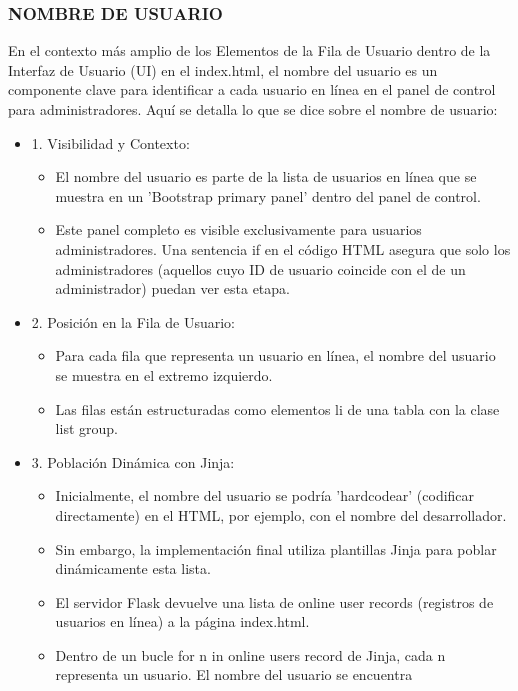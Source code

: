\documentclass{report}
\begin{document}
\subsubsection{NOMBRE DE USUARIO}
En el contexto más amplio de los Elementos de la Fila de Usuario dentro de la Interfaz de Usuario (UI) en el index.html, el nombre del 
usuario es un componente clave para identificar a cada usuario en línea en el panel de control para administradores.
Aquí se detalla lo que se dice sobre el nombre de usuario:
\begin{itemize}
    \item 1. Visibilidad y Contexto:
        \begin{itemize}
            \item El nombre del usuario es parte de la lista de usuarios en línea que se muestra en un 'Bootstrap primary panel' dentro 
            del panel de control.
            \item Este panel completo es visible exclusivamente para usuarios administradores. Una sentencia if en el código HTML asegura 
            que solo los administradores (aquellos cuyo ID de usuario coincide con el de un administrador) puedan ver esta etapa.
        \end{itemize}
    \item 2. Posición en la Fila de Usuario:
        \begin{itemize}
            \item Para cada fila que representa un usuario en línea, el nombre del usuario se muestra en el extremo izquierdo.
            \item Las filas están estructuradas como elementos li de una tabla con la clase list group.        
        \end{itemize}
    \item 3. Población Dinámica con Jinja:
        \begin{itemize}
            \item Inicialmente, el nombre del usuario se podría 'hardcodear' (codificar directamente) en el HTML, por ejemplo, con el nombre 
            del desarrollador.
            \item Sin embargo, la implementación final utiliza plantillas Jinja para poblar dinámicamente esta lista.
            \item El servidor Flask devuelve una lista de online user records (registros de usuarios en línea) a la página index.html.
            \item Dentro de un bucle for n in online users record de Jinja, cada n representa un usuario. El nombre del usuario se encuentra 

\end{itemize}
\end{itemize}
\end{document}
